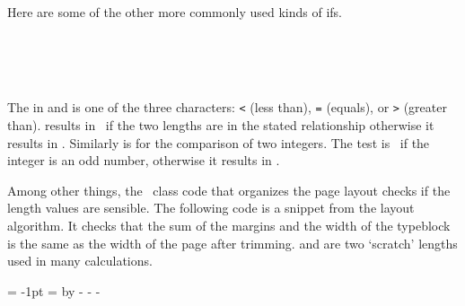 Here are some of the other more commonly used kinds of ifs.
\begin{syntax}
    \\
    \\
  \\
\end{syntax}
The  in  and  is one of the three characters:
\texttt{<} (less than), \texttt{=} (equals), or \texttt{>} (greater than).
 results in \ptrue\ if the two lengths are in the stated
relationship otherwise it results in \pfalse. Similarly 
is for the comparison of two integers. The  test is \ptrue\
if the integer  is an odd number, otherwise it results 
in \pfalse.

    Among other things, the \ltx\ class code that organizes the page layout
checks if the length values are sensible. The following code is a snippet
from the layout algorithm. It checks that the sum of the margins and the
width of the typeblock is the same as the width of the page after trimming.
\cmd{\@tempdima} and \cmd{\@tempdimb} are two `scratch' lengths used in many
calculations.
\begin{lcode}
\@tempdimb= -1pt              %
\@tempdima=\paperwidth              %
\advance\@tempdima by -\foremargin  %
\advance\@tempdima -\textwidth      %
\advance\@tempdima -\spinemargin    %
\ifdim\@tempdima < \@tempdimb       %
\fi
\end{lcode}

